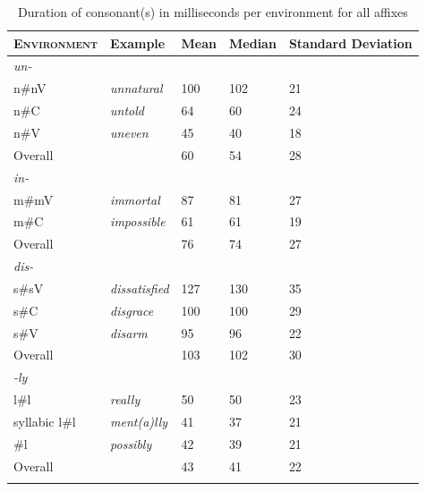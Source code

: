   \begin{table}
  	\caption{Duration of consonant(s) in milliseconds per environment for all affixes}
  	\label{tbl:Corpus raw duration}
  	
  		\begin{tabular} {lllll}
  			\lsptoprule
            \textsc{Environment} & Example & Mean & Median& Standard Deviation\\\midrule
  			\textit{un-}\\
  			\midrule			
  			\ttfamily n\#nV&\textit{unnatural} & 100 & 102 & 21\\ 
  			\ttfamily n\#C&\textit{untold} & 64 & 60 & 24\\ 
  			\ttfamily n\#V&\textit{uneven} & 45 & 40 & 18\\
  			Overall &  & 60 & 54 & 28\\ 
  			\midrule
  			\textit{in-}\\
            \midrule			
  			\ttfamily m\#mV&\textit{immortal} & 87 & 81 & 27\\   	
  			\ttfamily m\#C&\textit{impossible} & 61 & 61 & 19\\ 
  			Overall &  & 76 & 74 & 27\\ 
  			\midrule   
  			\textit{dis-}\\
  			\midrule			
  			\ttfamily s\#sV&\textit{dissatisfied} & 127 & 130  &35 \\ 
  			\ttfamily s\#C&\textit{disgrace} & 100 & 100& 29\\ 
  			\ttfamily s\#V&\textit{disarm} &95 & 96 & 22 \\ 
  			Overall &   &103   & 102  & 30  \\ 
  			\midrule   	
  			\textit{-ly}\\
  			\midrule
  			\ttfamily l\#l&\textit{really} & 50  & 50 & 23 \\ 
  			\ttfamily \is{syllabicity}syllabic l\#l&\textit{ment(a)lly} &41 & 37  & 21\\ 
  			\ttfamily \#l&\textit{possibly} & 42& 39& 21\\ 
  			Overall &  &43  &41 &22\\ 
  			\lspbottomrule                                                                                
		\end{tabular}
  \end{table}
  

